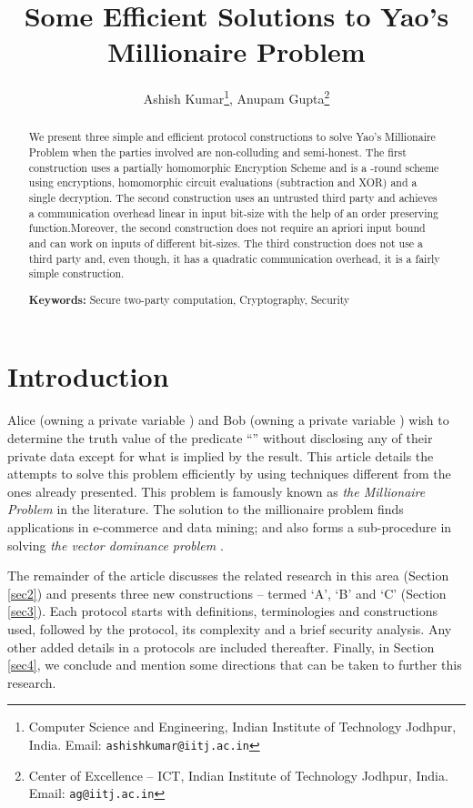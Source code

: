 \documentclass[11pt, letterpaper, romanappendices, onecolumn]{article}
\title{Some Efficient Solutions to Yao's Millionaire Problem}
\author{Ashish Kumar\footnote{Computer Science and Engineering,
	Indian Institute of Technology Jodhpur, India. Email: \texttt{ashishkumar@iitj.ac.in}},
	Anupam Gupta\footnote{Center of Excellence -- ICT, Indian Institute of Technology Jodhpur, India. Email: \texttt{ag@iitj.ac.in}}
}
\theoremstyle{plain}\newtheorem{thm}{Theorem}[section]
\theoremstyle{definition}
\theoremstyle{remark}
\begin{document}
	\maketitle
\begin{abstract}
We present three simple and efficient protocol constructions to solve Yao's Millionaire Problem when the parties involved are non-colluding and semi-honest. The first construction uses a partially homomorphic Encryption Scheme and is a -round scheme using  encryptions,  homomorphic circuit evaluations (subtraction and XOR) and a single decryption. The second construction uses an untrusted third party and achieves a communication overhead linear in input bit-size with the help of an order preserving function.Moreover, the second construction does not require an apriori input bound and can work on inputs of different bit-sizes. The third construction does not use a third party and, even though, it has a quadratic communication overhead, it is a fairly simple construction.
\newline 
\par \noindent \textbf{Keywords:} Secure two-party computation, Cryptography, Security
\end{abstract}

\section{Introduction}
Alice (owning a private variable ) and Bob (owning a private variable ) wish to determine the truth value of the predicate ``'' without disclosing any of their private data except for what is implied by the result. This article details the attempts to solve this problem efficiently by using techniques different from the ones already presented. This problem is famously known as \textit{the Millionaire Problem} in the literature. The solution to the millionaire problem finds applications in e-commerce and data mining; and also forms a sub-procedure in solving \textit{the vector dominance problem} \cite{du2001study}.

\par The remainder of the article discusses the related research in this area (Section \ref{sec2}) and presents three new constructions -- termed `\textsf{A}', `\textsf{B}' and `\textsf{C}' (Section \ref{sec3}). Each protocol starts with definitions, terminologies and constructions used, followed by the protocol, its complexity and a brief security analysis. Any other added details in a protocols are included thereafter. Finally, in Section \ref{sec4}, we conclude and mention some directions that can be taken to further this research.
\end{document}
